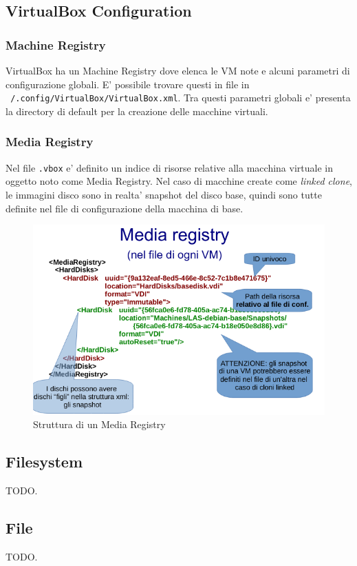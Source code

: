 \subsection{VirtualBox Configuration}
	\subsubsection{Machine Registry}
	VirtualBox ha un Machine Registry dove elenca le VM note e alcuni parametri di configurazione
	globali. E' possibile trovare questi in file in \texttt{~/.config/VirtualBox/VirtualBox.xml}.
	Tra questi parametri globali e' presenta la directory di default per la creazione delle macchine
	virtuali.

	\subsubsection{Media Registry}
	Nel file \texttt{.vbox} e' definito un indice di risorse relative alla macchina virtuale in oggetto
	noto come Media Registry. Nel caso di macchine create come \textit{linked clone}, le immagini
	disco sono in realta' snapshot del disco base, quindi sono tutte definite nel file di configurazione
	della macchina di base.
	
	\begin{figure}[H]
		\centering
		\includegraphics[scale=0.8]{img/media_registry.png}
		\caption{Struttura di un Media Registry}
	\end{figure}

\subsection{Filesystem}\label{filesystem}
TODO.

\subsection{File}\label{inode}
TODO.



